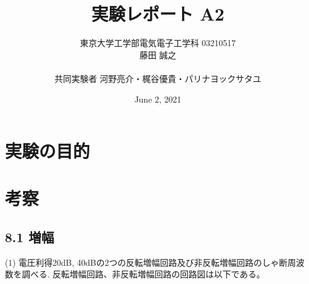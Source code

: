 \documentclass{ltjsarticle}
\title{実験レポート A2}
\author{東京大学工学部電気電子工学科 03210517\\藤田 誠之\\~\\ 共同実験者  河野亮介・梶谷優貴・パリナヨックサタユ}
\date{ June 2, 2021}
\begin{document}
\maketitle

\section{実験の目的}

\section{考察}
\newpage
\subsection*{8.1 増幅}
(1) 電圧利得20dB, 40dBの2つの反転増幅回路及び非反転増幅回路のしゃ断周波数を調べる. 
反転増幅回路、非反転増幅回路の回路図は以下である。
\end{document}
